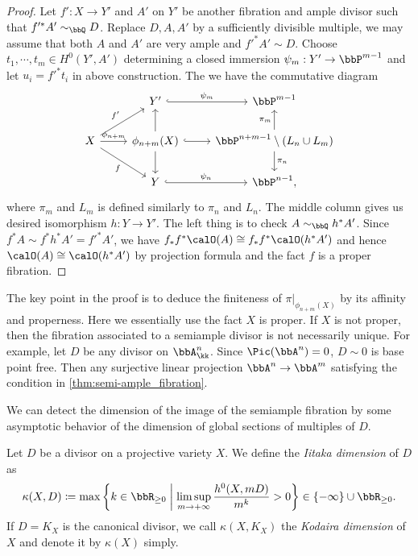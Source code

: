 \begin{proof}
    Let $f':X \to Y'$ and $A'$ on $Y'$ be another fibration and ample divisor such that $f'^*A' \sim_\bbQ D$.
    Replace $D,A,A'$ by a sufficiently divisible multiple, we may assume that both $A$ and $A'$ are very ample and $f'^*A' \sim D$.
    Choose $t_1,\cdots, t_m \in H^0(Y',A')$ determining a closed immersion $\psi_m: Y' \to \bbP^{m-1}$ and let $u_i = f'^*t_i$ in above construction.
    The we have the commutative diagram 
    \[ \begin{tikzcd}
        & Y' \ar[r, "\psi_m", hook] & \bbP^{m-1}\\
      X \ar[r,"\phi_{n+m}"] \ar[dr,"f"'] \ar[ur,"f'"] &\phi_{n+m}(X) \ar[d] \ar[u] \ar[r, hook] & \bbP^{n+m-1} \setminus (L_n\cup L_m) \ar[d, "\pi_n"] \ar[u, "\pi_m"] \\
        & Y \ar[r, "\psi_n", hook] & \bbP^{n-1},
    \end{tikzcd} \]
    where $\pi_m$ and $L_m$ is defined similarly to $\pi_n$ and $L_n$.
    The middle column gives us desired isomorphism $h:Y \to Y'$.
    The left thing is to check $A \sim_\bbQ h^*A'$.
    Since $f^*A \sim f^*h^*A'=f'^*A'$, we have $f_*f^*\calO(A) \cong f_*f^*\calO(h^*A')$ and hence $\calO(A) \cong \calO(h^*A')$ by projection formula and the fact $f$ is a proper fibration.
  \end{proof}
  \begin{remark}
    The key point in the proof is to deduce the finiteness of $\pi|_{\phi_{n+m}(X)}$ by its affinity and properness.
    Here we essentially use the fact $X$ is proper.
    If $X$ is not proper, then the fibration associated to a semiample divisor is not necessarily unique.
    For example, let $D$ be any divisor on $\bbA^n_\kk$.
    Since $\Pic(\bbA^n) = 0$, $D \sim 0$ is base point free.
    Then any surjective linear projection $\bbA^n \to \bbA^m$ satisfying the condition in \cref{thm:semi-ample_fibration}.
  \end{remark}

  We can detect the dimension of the image of the semiample fibration by some asymptotic behavior of the dimension of global sections of multiples of $D$.

  \begin{definition}
    Let $D$ be a divisor on a projective variety $X$.
    We define the \emph{Iitaka dimension} of $D$ as
    \[ \kappa(X, D) \coloneqq \max \left\{ k \in \bbR_{\geq 0} \;\middle|\; \limsup_{m \to +\infty} \frac{h^0(X, mD)}{m^k} > 0 \right\} \in \{-\infty\} \cup \bbR_{\geq 0}. \]
    If $D = K_X$ is the canonical divisor, we call $\kappa(X, K_X)$ the \emph{Kodaira dimension} of $X$ and denote it by $\kappa(X)$ simply.
  \end{definition}

